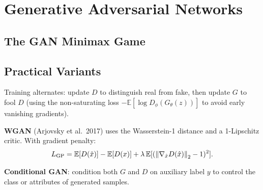 \documentclass[oneside]{book}
\begin{document}
\chapter{Generative Adversarial Networks}

\section{The GAN Minimax Game}



\section{Practical Variants}

Training alternates: update $D$ to distinguish real from fake, then update
$G$ to fool $D$ (using the non-saturating loss $-\mathbb{E}[\log D_\phi(G_\theta(z))]$
to avoid early vanishing gradients).

\textbf{WGAN} (Arjovsky et al.\ 2017) uses the Wasserstein-1 distance and a
1-Lipschitz critic.  With gradient penalty:
\[
    L_{\mathrm{GP}} = \mathbb{E}[D(\tilde x)] - \mathbb{E}[D(x)]
    + \lambda\,\mathbb{E}[(\left\lVert \nabla_{\hat x} D(\hat x) \right\rVert_2-1)^2].
\]

\textbf{Conditional GAN}: condition both $G$ and $D$ on auxiliary label $y$
to control the class or attributes of generated samples.
\end{document}
